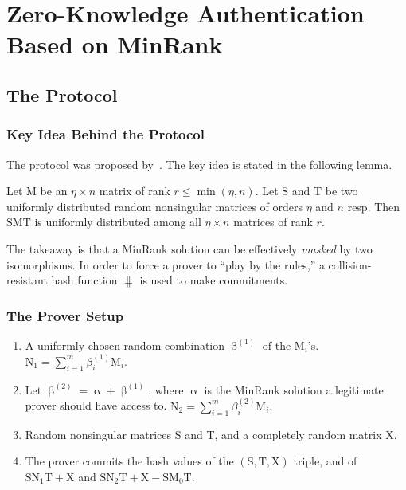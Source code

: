 \documentclass[serif, hyperref={unicode, breaklinks}, xcolor={x11names, psnames,
  dvipsnames, table}, usepdftitle=false]{beamer}
\renewcommand*{\vec}[1]{\bm{\mathrm{#1}}}
\newcommand{\matr}[1]{\bm{\mathrm{#1}}}
\begin{document}
\section{Zero-Knowledge Authentication Based on MinRank}
\subsection{The Protocol}
\begin{frame}
  \frametitle{Key Idea Behind the Protocol}
  The protocol was proposed by~\textcite{Cou01}.  The key idea is stated in the
  following lemma.
  \begin{lemma}\label{lem:mask}
    Let $\matr{M}$ be an $\eta \times n$ matrix of rank $r \le \min(\eta, n)$.
    Let $\matr{S}$ and $\matr{T}$ be two uniformly distributed random
    nonsingular matrices of orders $\eta$ and $n$ resp.  Then $\matr{S M T}$ is
    uniformly distributed among all $\eta \times n$ matrices of rank $r$.
  \end{lemma}
  The takeaway is that a MinRank solution can be effectively \emph{masked} by
  two isomorphisms.  In order to force a prover to ``play by the rules,'' a
  collision-resistant hash function $\hash$ is used to make commitments.
\end{frame}
\begin{frame}
  \frametitle{The Prover Setup}
  \begin{enumerate}
  \item A uniformly chosen random combination $\vec\upbeta^{(1)}$ of the
    $\matr{M}_i$'s.
    $\matr{N}_1 = \sum\nolimits_{i=1}^{m} \beta_i^{(1)} \matr{M}_i$.
  \item Let $\vec\upbeta^{(2)} = \vec\upalpha + \vec\upbeta^{(1)}$, where
    $\vec\upalpha$ is the MinRank solution a legitimate prover should have
    access to.  $\matr{N}_2 = \sum\nolimits_{i=1}^{m} \beta_i^{(2)} \matr{M}_i$.
  \item Random nonsingular matrices $\matr{S}$ and $\matr{T}$, and a completely
    random matrix $\matr{X}$.
  \item The prover commits the hash values of the
    $(\matr{S}, \matr{T}, \matr{X})$ triple, and of
    $\matr{S}\matr{N}_1\matr{T} + \matr{X}$ and
    $\matr{S}\matr{N}_2\matr{T} + \matr{X} - \matr{S}\matr{M}_0\matr{T}$.
  \end{enumerate}
\end{frame}
\end{document}
